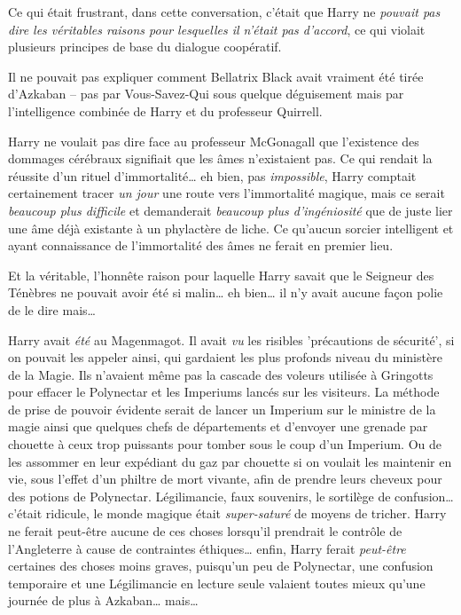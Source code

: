 \later

Ce qui était frustrant, dans cette conversation, c'était que Harry ne \emph{pouvait pas dire les véritables raisons pour lesquelles il n'était pas d'accord}, ce qui violait plusieurs principes de base du dialogue coopératif.

Il ne pouvait pas expliquer comment Bellatrix Black avait vraiment été tirée d'Azkaban -- pas par Vous-Savez-Qui sous quelque déguisement mais par l'intelligence combinée de Harry et du professeur Quirrell.

Harry ne voulait pas dire face au professeur McGonagall que l'existence des dommages cérébraux signifiait que les âmes n'existaient pas. Ce qui rendait la réussite d'un rituel d'immortalité… eh bien, pas \emph{impossible}, Harry comptait certainement tracer \emph{un jour} une route vers l'immortalité magique, mais ce serait \emph{beaucoup plus difficile} et demanderait \emph{beaucoup plus d'ingéniosité} que de juste lier une âme déjà existante à un phylactère de liche. Ce qu'aucun sorcier intelligent et ayant connaissance de l'immortalité des âmes ne ferait en premier lieu.

Et la véritable, l'honnête raison pour laquelle Harry savait que le Seigneur des Ténèbres ne pouvait avoir été si malin… eh bien… il n'y avait aucune façon polie de le dire mais…

Harry avait \emph{été} au Magenmagot. Il avait \emph{vu} les risibles 'précautions de sécurité', si on pouvait les appeler ainsi, qui gardaient les plus profonds niveau du ministère de la Magie. Ils n'avaient même pas la cascade des voleurs utilisée à Gringotts pour effacer le Polynectar et les Imperiums lancés sur les visiteurs. La méthode de prise de pouvoir évidente serait de lancer un Imperium sur le ministre de la magie ainsi que quelques chefs de départements et d'envoyer une grenade par chouette à ceux trop puissants pour tomber sous le coup d'un Imperium. Ou de les assommer en leur expédiant du gaz par chouette si on voulait les maintenir en vie, sous l'effet d'un philtre de mort vivante, afin de prendre leurs cheveux pour des potions de Polynectar. Légilimancie, faux souvenirs, le sortilège de confusion… c'était ridicule, le monde magique était \emph{super-saturé} de moyens de tricher. Harry ne ferait peut-être aucune de ces choses lorsqu'il prendrait le contrôle de l'Angleterre à cause de contraintes éthiques… enfin, Harry ferait \emph{peut-être} certaines des choses moins graves, puisqu'un peu de Polynectar, une confusion temporaire et une Légilimancie en lecture seule valaient toutes mieux qu'une journée de plus à Azkaban… mais…

